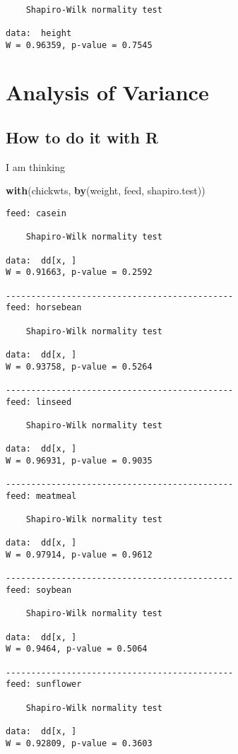 \documentclass[]{book}
\newenvironment{Shaded}{\begin{snugshade}}{\end{snugshade}}
\newcommand{\KeywordTok}[1]{\textcolor[rgb]{0.13,0.29,0.53}{\textbf{{#1}}}}
\newcommand{\NormalTok}[1]{{#1}}
\numberwithin{equation}{chapter}
\numberwithin{figure}{chapter}
\theoremstyle{plain}
\theoremstyle{definition}
\theoremstyle{remark}
\theoremstyle{definition}
\theoremstyle{definition}
\theoremstyle{remark}
\begin{document}
\begin{verbatim}

    Shapiro-Wilk normality test

data:  height
W = 0.96359, p-value = 0.7545
\end{verbatim}

\section{Analysis of Variance}\label{sec-analysis-of-variance}

\subsection{How to do it with R}\label{how-to-do-it-with-r-46}

I am thinking

\begin{Shaded}
\begin{Highlighting}[]
\KeywordTok{with}\NormalTok{(chickwts, }\KeywordTok{by}\NormalTok{(weight, feed, shapiro.test))}
\end{Highlighting}
\end{Shaded}

\begin{verbatim}
feed: casein

    Shapiro-Wilk normality test

data:  dd[x, ]
W = 0.91663, p-value = 0.2592

--------------------------------------------- 
feed: horsebean

    Shapiro-Wilk normality test

data:  dd[x, ]
W = 0.93758, p-value = 0.5264

--------------------------------------------- 
feed: linseed

    Shapiro-Wilk normality test

data:  dd[x, ]
W = 0.96931, p-value = 0.9035

--------------------------------------------- 
feed: meatmeal

    Shapiro-Wilk normality test

data:  dd[x, ]
W = 0.97914, p-value = 0.9612

--------------------------------------------- 
feed: soybean

    Shapiro-Wilk normality test

data:  dd[x, ]
W = 0.9464, p-value = 0.5064

--------------------------------------------- 
feed: sunflower

    Shapiro-Wilk normality test

data:  dd[x, ]
W = 0.92809, p-value = 0.3603
\end{verbatim}
\end{document}
